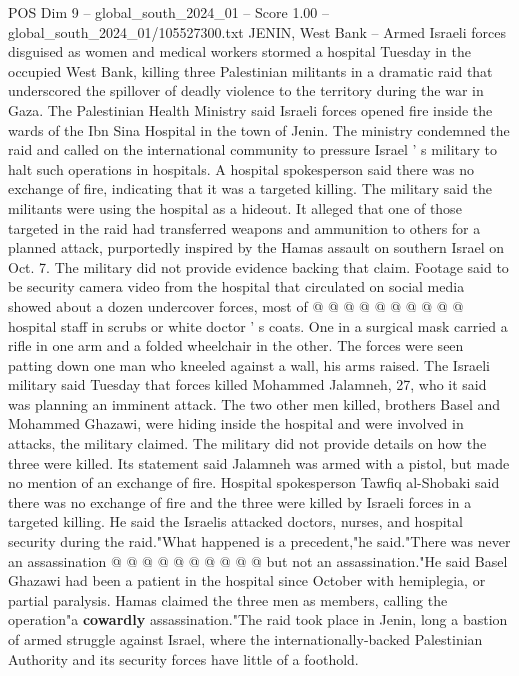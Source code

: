 \begin{textsample}{POS Dim 9 – global\_south\_2024\_01 – Score 1.00 – global\_south\_2024\_01/105527300.txt}  \label{ex:f9_pos_069}
JENIN, West Bank -- Armed Israeli forces disguised as women and medical workers stormed a hospital Tuesday in the occupied West Bank, killing three Palestinian militants in a dramatic raid that underscored the spillover of deadly violence to the territory during the war in Gaza.
The Palestinian Health Ministry said Israeli forces opened fire inside the wards of the Ibn Sina Hospital in the town of Jenin.
The ministry condemned the raid and called on the international community to pressure Israel ' s military to halt such operations in hospitals.
A hospital spokesperson said there was no exchange of fire, indicating that it was a targeted killing.
The military said the militants were using the hospital as a hideout.
It alleged that one of those targeted in the raid had transferred weapons and ammunition to others for a planned attack, purportedly inspired by the Hamas assault on southern Israel on Oct. 7.
The military did not provide evidence backing that claim.
Footage said to be security camera video from the hospital that circulated on social media showed about a dozen undercover forces, most of @ @ @ @ @ @ @ @ @ @ hospital staff in scrubs or white doctor ' s coats.
One in a surgical mask carried a rifle in one arm and a folded wheelchair in the other.
The forces were seen patting down one man who kneeled against a wall, his arms raised.
The Israeli military said Tuesday that forces killed Mohammed Jalamneh, 27, who it said was planning an imminent attack.
The two other men killed, brothers Basel and Mohammed Ghazawi, were hiding inside the hospital and were involved in attacks, the military claimed.
The military did not provide details on how the three were killed.
Its statement said Jalamneh was armed with a pistol, but made no mention of an exchange of fire.
Hospital spokesperson Tawfiq al-Shobaki said there was no exchange of fire and the three were killed by Israeli forces in a targeted killing.
He said the Israelis attacked doctors, nurses, and hospital security during the raid."What happened is a precedent,"he said."There was never an assassination @ @ @ @ @ @ @ @ @ @ but not an assassination."He said Basel Ghazawi had been a patient in the hospital since October with hemiplegia, or partial paralysis.
Hamas claimed the three men as members, calling the operation"a \textbf{cowardly} assassination."The raid took place in Jenin, long a bastion of armed struggle against Israel, where the internationally-backed Palestinian Authority and its security forces have little of a foothold.

\end{textsample}

